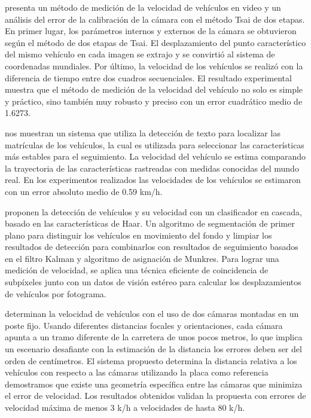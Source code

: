 \citeauthor{yan2010Research} presenta un método de medición de la velocidad de vehículos en video y un análisis del error de la calibración de la cámara con el método Tsai de dos etapas. En primer lugar, los parámetros internos y externos de la cámara se obtuvieron según el método de dos etapas de Tsai. El desplazamiento del punto característico del mismo vehículo en cada imagen se extrajo y se convirtió al sistema de coordenadas mundiales. Por último, la velocidad de los vehículos se realizó con la diferencia de tiempo entre dos cuadros secuenciales. El resultado experimental muestra que el método de medición de la velocidad del vehículo no solo es simple y práctico, sino también muy robusto y preciso con un error cuadrático medio de 1.6273.


\citeauthor{luvizon2014Vehicle} nos muestran un sistema que utiliza la detección de texto para localizar las matrículas de los vehículos, la cual es utilizada para seleccionar las características más estables para el seguimiento. La velocidad del vehículo se estima comparando la trayectoria de las características rastreadas con medidas conocidas del mundo real. En los experimentos realizados las velocidades de los vehículos se estimaron con un error absoluto medio de 0.59 km/h.


\citeauthor{jalalat2016Vehicle} proponen la detección de vehículos y su velocidad con  un clasificador en cascada, basado en las características de Haar. Un algoritmo de segmentación de primer plano para distinguir los vehículos en movimiento del fondo y limpiar los resultados de detección para combinarlos con  resultados de seguimiento basados en el filtro Kalman y algoritmo de asignación de Munkres. Para lograr una medición de velocidad, se aplica una técnica eficiente de coincidencia de subpíxeles junto con un datos de visión estéreo para calcular los desplazamientos de vehículos por fotograma.


\citeauthor{llorca2016Two} determinan la velocidad de vehículos con el uso de dos cámaras montadas en un poste fijo. Usando diferentes distancias focales y orientaciones, cada cámara apunta a un tramo diferente de la carretera de unos pocos metros, lo que implica un escenario desafiante con la estimación de la distancia los errores deben ser del orden de centímetros.  El sistema propuesto determina la distancia relativa a los vehículos con respecto a las cámaras utilizando la placa como referencia demostramos que existe una geometría específica entre las cámaras que minimiza el error de velocidad. Los resultados obtenidos validan la propuesta con errores de velocidad máxima  de menos 3 k/h a velocidades de hasta 80 k/h.


